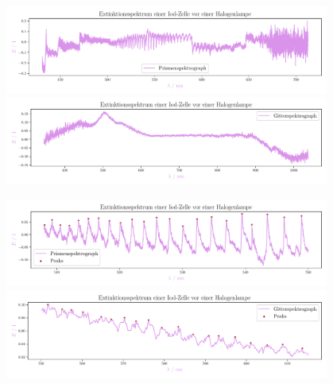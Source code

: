 \documentclass[12pt,english,ngerman]{scrartcl}
\begin{document}
\begin{figure}[H]
	\begin{center}
		\includegraphics[width=0.95\textwidth]{figures/prism_extinction.pdf}
		\includegraphics[width=0.95\textwidth]{figures/gitter_extinction.pdf}
	\end{center}
	\caption{}\label{fig:extinktionkurven}
\end{figure}

\begin{figure}[H]
	\begin{center}
		\includegraphics[width=0.95\textwidth]{figures/prism_ausschnitt_extinction.pdf}
		\includegraphics[width=0.95\textwidth]{figures/gitter_ausschnitt_extinction.pdf}
	\end{center}
	\caption{}\label{fig:ausschnittPeaks}
\end{figure}
\end{document}
